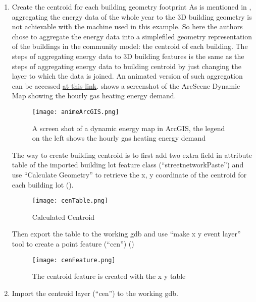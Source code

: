 \begin{enumerate}[1)]
\item Create the centroid for each building geometry footprint As is
  mentioned in , aggregating the energy data
  of the whole year to the 3D building geometry is not achievable with
  the machine used in this example. So here the authors chose to
  aggregate the energy data into a simplefiled geometry representation
  of the buildings in the community model: the centroid of each
  building. The steps of aggregating energy data to 3D building
  features is the same as the steps of aggregating energy data to
  building centroid by just changing the layer to which the data is
  joined. An animated version of such aggregation can be accessed
  \href{http://www.armechxyj.com/energy-mapping.html#arcgisAnime}{at
    this link}.  shows a screenshot of the
  ArcScene Dynamic Map showing the hourly gas heating energy demand. 

\begin{figure}[h!]
  \centering
  \texttt{[image: animeArcGIS.png]}
  \caption[3D Dynamic Heat Map in ArcGIS]{A screen shot of a dynamic
    energy map in ArcGIS, the legend on the left shows the hourly gas
    heating energy demand}
  \label{fig:animeArcGIS}
\end{figure}

The way to create building centroid is to first add two extra field in
attribute table of the imported building lot feature class
(``streetnetworkPaste'') and use ``Calculate Geometry'' to retrieve
the x, y coordinate of the centroid for each building lot
().
\begin{figure}[h!]
  \centering
  \texttt{[image: cenTable.png]}
  \caption[Calculated Centroid]{Calculated Centroid}
  \label{fig:cenTable}
\end{figure}

Then export the table to the working gdb and use ``make x y event
layer'' tool to create a point feature (``cen'')
()
\begin{figure}[h!]
  \centering
  \texttt{[image: cenFeature.png]}
  \caption[Created Centroid Feature]{The centroid feature is created
    with the x y table}
  \label{fig:cenFeature}
\end{figure}

\item Import the centroid layer (``cen'') to the working gdb. 


\end{enumerate}
